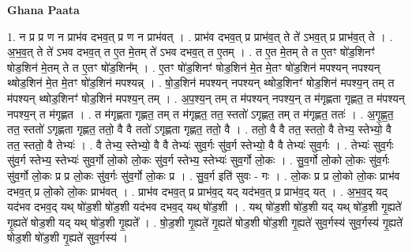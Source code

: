 \documentclass[17pt]{extarticle}
\begin{document}
\textbf{Ghana Paata } \newline

1. न प्र प्र ण न प्राभ॑व दभव॒त् प्र ण न प्राभ॑वत् । . प्राभ॑व दभव॒त् प्र प्राभ॑व॒त् ते ते॑ ऽभव॒त् प्र प्राभ॑व॒त् ते । . अ॒भ॒व॒त् ते ते॑ ऽभव दभव॒त् त ए॒त मे॒तम् ते॑ ऽभव दभव॒त् त ए॒तम् । . त ए॒त मे॒तम् ते त ए॒तꣳ षो॑ड॒शिनꣳ॑ षोड॒शिन॑ मे॒तम् ते त ए॒तꣳ षो॑ड॒शिन᳚म् । . ए॒तꣳ षो॑ड॒शिनꣳ॑ षोड॒शिन॑ मे॒त मे॒तꣳ षो॑ड॒शिन॑ मपश्यन् नपश्यन् थ्षोड॒शिन॑ मे॒त मे॒तꣳ षो॑ड॒शिन॑ मपश्यन्न् । . षो॒ड॒शिन॑ मपश्यन् नपश्यन् थ्षोड॒शिनꣳ॑ षोड॒शिन॑ मपश्य॒न् तम् त म॑पश्यन् थ्षोड॒शिनꣳ॑ षोड॒शिन॑ मपश्य॒न् तम् । . अ॒प॒श्य॒न् तम् त म॑पश्यन् नपश्य॒न् त म॑गृह्णता गृह्णत॒ त म॑पश्यन् नपश्य॒न् त म॑गृह्णत । . त म॑गृह्णता गृह्णत॒ तम् त म॑गृह्णत॒ तत॒ स्ततो॑ ऽगृह्णत॒ तम् त म॑गृह्णत॒ ततः॑ । . अ॒गृ॒ह्ण॒त॒ तत॒ स्ततो॑ ऽगृह्णता गृह्णत॒ ततो॒ वै वै ततो॑ ऽगृह्णता गृह्णत॒ ततो॒ वै । . ततो॒ वै वै तत॒ स्ततो॒ वै तेभ्य॒ स्तेभ्यो॒ वै तत॒ स्ततो॒ वै तेभ्यः॑ । . वै तेभ्य॒ स्तेभ्यो॒ वै वै तेभ्यः॑ सुव॒र्गः सु॑व॒र्ग स्तेभ्यो॒ वै वै तेभ्यः॑ सुव॒र्गः । . तेभ्यः॑ सुव॒र्गः सु॑व॒र्ग स्तेभ्य॒ स्तेभ्यः॑ सुव॒र्गो लो॒को लो॒कः सु॑व॒र्ग स्तेभ्य॒ स्तेभ्यः॑ सुव॒र्गो लो॒कः । . सु॒व॒र्गो लो॒को लो॒कः सु॑व॒र्गः सु॑व॒र्गो लो॒कः प्र प्र लो॒कः सु॑व॒र्गः सु॑व॒र्गो लो॒कः प्र । . सु॒व॒र्ग इति॑ सुवः - गः । . लो॒कः प्र प्र लो॒को लो॒कः प्राभ॑व दभव॒त् प्र लो॒को लो॒कः प्राभ॑वत् । . प्राभ॑व दभव॒त् प्र प्राभ॑व॒द् यद् यद॑भव॒त् प्र प्राभ॑व॒द् यत् । . अ॒भ॒व॒द् यद् यद॑भव दभव॒द् यथ् षो॑ड॒शी षो॑ड॒शी यद॑भव दभव॒द् यथ् षो॑ड॒शी । . यथ् षो॑ड॒शी षो॑ड॒शी यद् यथ् षो॑ड॒शी गृ॒ह्यते॑ गृ॒ह्यते॑ षोड॒शी यद् यथ् षो॑ड॒शी गृ॒ह्यते᳚ । . षो॒ड॒शी गृ॒ह्यते॑ गृ॒ह्यते॑ षोड॒शी षो॑ड॒शी गृ॒ह्यते॑ सुव॒र्गस्य॑ सुव॒र्गस्य॑ गृ॒ह्यते॑ षोड॒शी षो॑ड॒शी गृ॒ह्यते॑ सुव॒र्गस्य॑ । \newline
\end{document}
